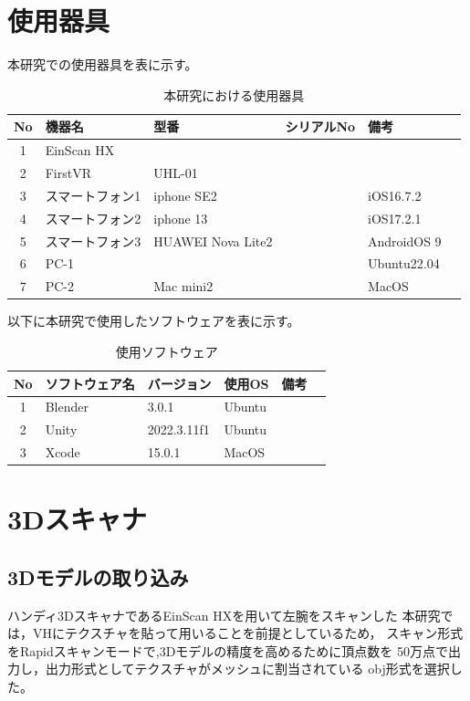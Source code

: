 \documentclass{ltjsreport}
\begin{document}
	\section{使用器具}
		本研究での使用器具を表に示す。
	\begin{table}[H]
	\begin{center}
	\caption{本研究における使用器具}
	\label{tab:usedev}
	\begin{tabular}{clllll} \toprule
	No&\multicolumn{1}{l}{機器名}&\multicolumn{1}{l}{型番}&\multicolumn{1}{l}{シリアルNo}&\multicolumn{1}{l}{備考}\\ \hline
	1&EinScan HX&&&\\
	2&FirstVR&UHL-01&&\\
	3&スマートフォン1&iphone SE2&&iOS16.7.2\\
	4&スマートフォン2&iphone 13&&iOS17.2.1\\
	5&スマートフォン3&HUAWEI Nova Lite2&&AndroidOS 9\\
	6&PC-1&&&Ubuntu22.04\\
	7&PC-2&Mac mini2&&MacOS\\
	\bottomrule
	\end{tabular}
	\end{center}
	\end{table}
	以下に本研究で使用したソフトウェアを表に示す。
	\begin{table}[H]
	\begin{center}
	\caption{使用ソフトウェア}
	\label{tab:usesoft}
	\begin{tabular}{clllll} \toprule
	No&\multicolumn{1}{l}{ソフトウェア名}&\multicolumn{1}{l}{バージョン}&\multicolumn{1}{l}{使用OS}&\multicolumn{1}{l}{備考}\\ \hline
	1&Blender&3.0.1&Ubuntu&\\
	2&Unity&2022.3.11f1&Ubuntu&\\
	3&Xcode&15.0.1&MacOS&\\
	\bottomrule
	\end{tabular}
	\end{center}
	\end{table}
	\section{3Dスキャナ}
		\subsection{3Dモデルの取り込み}
			ハンディ3DスキャナであるEinScan HXを用いて左腕をスキャンした
			本研究では，VHにテクスチャを貼って用いることを前提としているため，
			スキャン形式をRapidスキャンモードで,3Dモデルの精度を高めるために頂点数を
			50万点で出力し，出力形式としてテクスチャがメッシュに割当されている
			obj形式を選択した。
\end{document}

